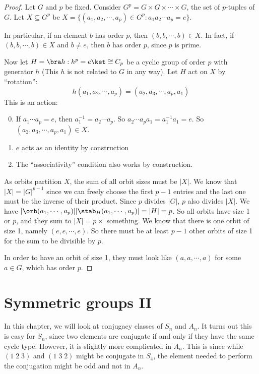 \documentclass[a4paper]{article}
\begin{document}
\begin{proof}
  Let $G$ and $p$ be fixed. Consider $G^p = G\times G\times \cdots \times G$, the set of $p$-tuples of $G$. Let $X \subseteq G^p$ be $X = \{(a_1, a_2, \cdots, a_p)\in G^p: a_1a_2\cdots a_p = e\}$.

  In particular, if an element $b$ has order $p$, then $(b, b, \cdots, b)\in X$. In fact, if $(b, b, \cdots, b)\in X$ and $b\not= e$, then $b$ has order $p$, since $p$ is prime.

  Now let $H = \bra h: h^p = e\ket\cong C_p$ be a cyclic group of order $p$ with generator $h$ (This $h$ is not related to $G$ in any way). Let $H$ act on $X$ by ``rotation'':
  \[
    h(a_1, a_2, \cdots, a_p) = (a_2, a_3, \cdots, a_p, a_1)
  \]
  This is an action:
  \begin{enumerate}[label=\arabic{*}.]
      \setcounter{enumi}{-1}
    \item If $a_1\cdots a_p = e$, then $a_1^{-1} = a_2\cdots a_p$. So $a_2\cdots a_pa_1 = a_1^{-1}a_1 = e$. So $(a_2, a_3, \cdots, a_p, a_1)\in X$.
    \item $e$ acts as an identity by construction
    \item The ``associativity'' condition also works by construction.
  \end{enumerate}

  As orbits partition $X$, the sum of all orbit sizes must be $|X|$. We know that $|X| = |G|^{p - 1}$ since we can freely choose the first $p - 1$ entries and the last one must be the inverse of their product. Since $p$ divides $|G|$, $p$ also divides $|X|$. We have $|\orb(a_1, \cdots , a_p)||\stab_H(a_1, \cdots, a_p)| = |H| = p$. So all orbits have size 1 or $p$, and they sum to $|X| = p\times$ something. We know that there is one orbit of size 1, namely $(e, e, \cdots, e)$. So there must be at least $p - 1$ other orbits of size 1 for the sum to be divisible by $p$.

  In order to have an orbit of size 1, they must look like ${(a, a, \cdots, a)}$ for some $a\in G$, which has order $p$.
\end{proof}

\section{Symmetric groups II}
\label{sec:sym2}
In this chapter, we will look at conjugacy classes of $S_n$ and $A_n$. It turns out this is easy for $S_n$, since two elements are conjugate if and only if they have the same cycle type. However, it is slightly more complicated in $A_n$. This is since while $(1\; 2\; 3)$ and $(1\; 3\; 2)$ might be conjugate in $S_4$, the element needed to perform the conjugation might be odd and not in $A_n$.
\end{document}
